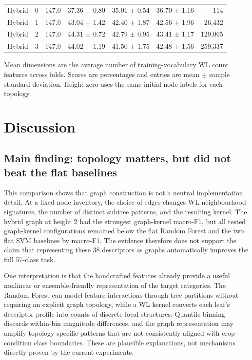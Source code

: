 \documentclass[conference]{IEEEtran}
\begin{document}
\begin{table}[!t]
{\begin{tabular}{llrrrrr}
Hybrid & 0 & 147.0 & 37.36 $\pm$ 0.80 & 35.01 $\pm$ 0.54 & 36.70 $\pm$ 1.16 & 114 \\
Hybrid & 1 & 147.0 & 43.04 $\pm$ 1.42 & 42.40 $\pm$ 1.87 & 42.56 $\pm$ 1.96 & 26,432 \\
Hybrid & 2 & 147.0 & 44.31 $\pm$ 0.72 & 42.79 $\pm$ 0.95 & 43.41 $\pm$ 1.17 & 129,065 \\
Hybrid & 3 & 147.0 & 44.02 $\pm$ 1.19 & 41.50 $\pm$ 1.75 & 42.48 $\pm$ 1.56 & 259,337 \\
\bottomrule
\end{tabular}%
}
\smallskip
\begin{minipage}{0.96\linewidth}\footnotesize Mean dimensions are the average number of training-vocabulary WL count features across folds. Scores are percentages and entries are mean $\pm$ sample standard deviation. Height zero uses the same initial node labels for each topology.\end{minipage}
\end{table}

\section{Discussion}

\subsection{Main finding: topology matters, but did not beat the flat baselines}

This comparison shows that graph construction is not a neutral implementation detail. At a fixed node inventory, the choice of edges changes WL neighbourhood signatures, the number of distinct subtree patterns, and the resulting kernel. The hybrid graph at height 2 had the strongest graph-kernel macro-F1, but all tested graph-kernel configurations remained below the flat Random Forest and the two flat SVM baselines by macro-F1. The evidence therefore does not support the claim that representing these 38 descriptors as graphs automatically improves the full 57-class task.

One interpretation is that the handcrafted features already provide a useful nonlinear or ensemble-friendly representation of the target categories. The Random Forest can model feature interactions through tree partitions without requiring an explicit graph topology, while a WL kernel converts each leaf's descriptor profile into counts of discrete local structures. Quantile binning discards within-bin magnitude differences, and the graph representation may amplify topology-specific patterns that are not consistently aligned with crop--condition class boundaries. These are plausible explanations, not mechanisms directly proven by the current experiments.
\end{document}
